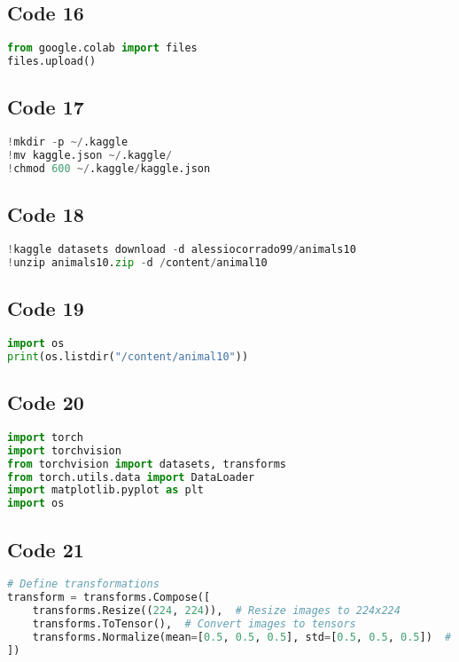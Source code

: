 \documentclass{article}
\begin{document}
\subsection*{Code 16}
\begin{lstlisting}[language=Python]
from google.colab import files
files.upload()
\end{lstlisting}

\subsection*{Code 17}
\begin{lstlisting}[language=Python]
!mkdir -p ~/.kaggle
!mv kaggle.json ~/.kaggle/
!chmod 600 ~/.kaggle/kaggle.json
\end{lstlisting}

\subsection*{Code 18}
\begin{lstlisting}[language=Python]
!kaggle datasets download -d alessiocorrado99/animals10
!unzip animals10.zip -d /content/animal10
\end{lstlisting}

\subsection*{Code 19}
\begin{lstlisting}[language=Python]
import os
print(os.listdir("/content/animal10"))
\end{lstlisting}

\subsection*{Code 20}
\begin{lstlisting}[language=Python]
import torch
import torchvision
from torchvision import datasets, transforms
from torch.utils.data import DataLoader
import matplotlib.pyplot as plt
import os

\end{lstlisting}

\subsection*{Code 21}
\begin{lstlisting}[language=Python]
# Define transformations
transform = transforms.Compose([
    transforms.Resize((224, 224)),  # Resize images to 224x224
    transforms.ToTensor(),  # Convert images to tensors
    transforms.Normalize(mean=[0.5, 0.5, 0.5], std=[0.5, 0.5, 0.5])  # Normalize pixel values
])
\end{lstlisting}
\end{document}
